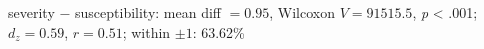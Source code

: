 severity $-$ susceptibility: mean diff $=0.95$, Wilcoxon $V=91515.5$, \textit{p} < .001; $d_z=0.59$, $r=0.51$; within $\pm 1$: 63.62\%%
